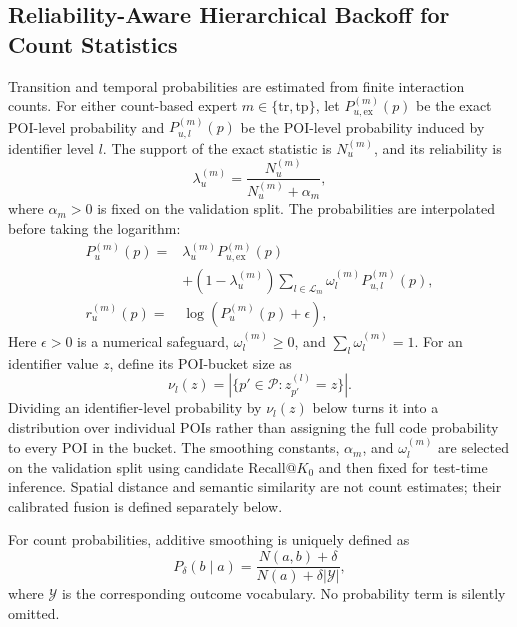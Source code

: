 \documentclass[journal]{IEEEtran}
\newcommand{\POIs}{\mathcal{P}}
\begin{document}
\subsection{Reliability-Aware Hierarchical Backoff for Count Statistics}
\label{subsec:backoff}

Transition and temporal probabilities are estimated from finite interaction
counts. For either count-based expert $m\in\{\mathrm{tr},\mathrm{tp}\}$, let
$P_{u,\mathrm{ex}}^{(m)}(p)$ be the exact POI-level probability and
$P_{u,l}^{(m)}(p)$ be the POI-level probability induced by identifier level
$l$. The support of the exact statistic is $N_u^{(m)}$, and its reliability is
\begin{equation}
\lambda_{u}^{(m)}
=
\frac{N_{u}^{(m)}}{N_{u}^{(m)}+\alpha_m},
\label{eq:reliability}
\end{equation}
where $\alpha_m>0$ is fixed on the validation split.
The probabilities are interpolated before taking the logarithm:
\begin{align}
P_u^{(m)}(p)
={}&
\lambda_u^{(m)}P_{u,\mathrm{ex}}^{(m)}(p)
\nonumber\\
&+
(1-\lambda_u^{(m)})
\sum_{l\in\mathcal{L}_m}
\omega_l^{(m)}P_{u,l}^{(m)}(p),
\label{eq:unified_backoff_probability}\\
r_u^{(m)}(p)
={}&
\log\!\left(P_u^{(m)}(p)+\epsilon\right),
\label{eq:unified_backoff}
\end{align}
Here $\epsilon>0$ is a numerical safeguard,
$\omega_l^{(m)}\ge0$, and $\sum_l\omega_l^{(m)}=1$.
For an identifier value $z$, define its POI-bucket size as
\begin{equation}
\nu_l(z)
=
\left|\{p'\in\POIs:z_{p'}^{(l)}=z\}\right|.
\label{eq:identifier_bucket_size}
\end{equation}
Dividing an identifier-level probability by $\nu_l(z)$ below turns it into a
distribution over individual POIs rather than assigning the full code
probability to every POI in the bucket.
The smoothing constants, $\alpha_m$, and $\omega_l^{(m)}$ are selected on the
validation split using candidate Recall@$K_0$ and then fixed for test-time
inference. Spatial distance and semantic similarity are not count estimates;
their calibrated fusion is defined separately below.

For count probabilities, additive smoothing is uniquely defined as
\begin{equation}
P_{\delta}(b\mid a)
=
\frac{N(a,b)+\delta}{N(a)+\delta|\mathcal{Y}|},
\label{eq:additive_smoothing}
\end{equation}
where $\mathcal{Y}$ is the corresponding outcome vocabulary.
No probability term is silently omitted.
\end{document}
